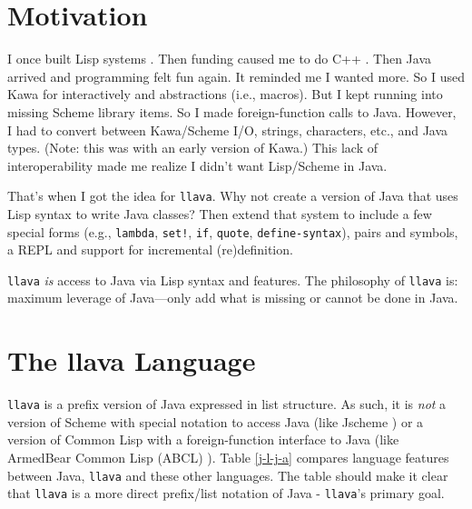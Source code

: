 \documentclass{acm-final/sig-alternate-modified}
\begin{document}


\section{Motivation}

I once built Lisp systems \cite{LaSC5,LaSC3}.  Then funding caused me
to do C++ \cite{DC++}.  Then Java arrived and programming felt fun
again.  It reminded me I wanted more.  So I used Kawa \cite{kawa} for
interactively and abstractions (i.e., macros).  But I kept running
into missing Scheme library items.  So I made foreign-function calls
to Java.  However, I had to convert between Kawa/Scheme I/O, strings,
characters, etc., and Java types.  (Note: this was with an early
version of Kawa.)  This lack of interoperability made me realize I
didn't want Lisp/Scheme in Java.

That's when I got the idea for {\tt llava}.  Why not create a version
of Java that uses Lisp syntax to write Java classes?  Then extend that
system to include a few special forms (e.g., {\tt lambda}, {\tt set!},
{\tt if}, {\tt quote}, {\tt define-syntax}), pairs and symbols, a REPL
and support for incremental (re)definition.

{\tt llava} \emph{is} access to Java via Lisp syntax and features.
The philosophy of {\tt llava} is: maximum leverage of Java---only add
what is missing or cannot be done in Java.

\section{The llava Language}

{\tt llava} is a prefix version of Java expressed in list structure.
As such, it is \emph{not} a version of Scheme with special notation to
access Java (like Jscheme \cite{jscheme}) or a version of Common Lisp
with a foreign-function interface to Java (like ArmedBear Common Lisp
(ABCL) \cite{abcl}).  Table \ref{j-l-j-a} compares language features
between Java, {\tt llava} and these other languages.  The table should
make it clear that {\tt llava} is a more direct prefix/list notation
of Java - {\tt llava}'s primary goal.
\end{document}
